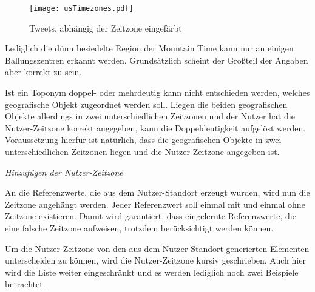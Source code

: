 					 \begin{figure}[!ht]
						\begin{center}
							\texttt{[image: usTimezones.pdf]}
							\caption{Tweets, abhängig der Zeitzone eingefärbt}
							\label{img:usTimezones}
						\end{center}
					\end{figure}	

					Lediglich die dünn besiedelte Region der Mountain Time kann nur an einigen Ballungszentren erkannt werden. 
					Grundsätzlich scheint der Großteil der Angaben aber korrekt zu sein.

					Ist ein Toponym doppel- oder mehrdeutig kann nicht entschieden werden, welches geografische Objekt zugeordnet werden soll.
					Liegen die beiden geografischen Objekte allerdings in zwei unterschiedlichen Zeitzonen und der Nutzer hat die Nutzer-Zeitzone korrekt angegeben, kann die Doppeldeutigkeit aufgelöst werden.
					Voraussetzung hierfür ist natürlich, dass die geografischen Objekte in zwei unterschiedlichen Zeitzonen liegen und die Nutzer-Zeitzone angegeben ist.

				\textit{Hinzufügen der Nutzer-Zeitzone} 

					An die Referenzwerte, die aus dem Nutzer-Standort erzeugt wurden, wird nun die Zeitzone angehängt werden.
					Jeder Referenzwert soll einmal mit und einmal ohne Zeitzone existieren. 
					Damit wird garantiert, dass eingelernte Referenzwerte, die eine falsche Zeitzone aufweisen, trotzdem berücksichtigt werden können. 

					Um die Nutzer-Zeitzone von den aus dem Nutzer-Standort generierten Elementen unterscheiden zu können, wird die Nutzer-Zeitzone kursiv geschrieben.
					Auch hier wird die Liste weiter eingeschränkt und es werden lediglich noch zwei Beispiele betrachtet.
					
